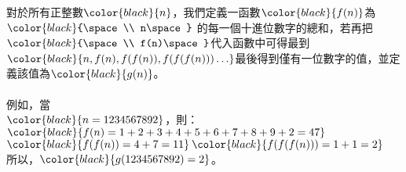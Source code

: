 對於所有正整數$\color{black}{\space n\space}$，我們定義一函數$\color{black}{\space f(n)\space}$為$\color{black}{\space\\
n\space}$ 的每一個十進位數字的總和，若再把$\color{black}{\space\\
f(n)\space}$代入函數中可得最到$\color{black}{\space n,f(n),f(f(n)),f(f(f(n))) \dots\space}$最後得到僅有一位數字的值，並定義該值為$\color{black}{\space g(n)\space}$。\\
\\
例如，當\\
$\color{black}{\space n=1234567892\space}$，則：\\
$\color{black}{\space f(n)=1+2+3+4+5+6+7+8+9+2=47\space}$$\color{black}{\space f(f(n))=4+7=11\space}$$\color{black}{\space f(f(f(n)))=1+1=2\space}$\\
所以，$\color{black}{\space g(1234567892)=2\space}$。\\
